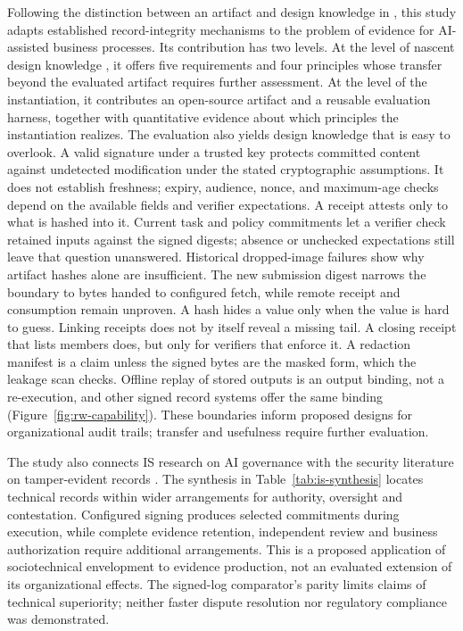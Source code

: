 \documentclass[11pt]{article}
\begin{document}
Following the distinction between an artifact and design knowledge in \citet{gregor2013}, this study adapts established record-integrity mechanisms to the problem of evidence for AI-assisted business processes. Its contribution has two levels. At the level of nascent design knowledge \citep{gregor2013}, it offers five requirements and four principles whose transfer beyond the evaluated artifact requires further assessment. At the level of the instantiation, it contributes an open-source artifact and a reusable evaluation harness, together with quantitative evidence about which principles the instantiation realizes. The evaluation also yields design knowledge that is easy to overlook. A valid signature under a trusted key protects committed content against undetected modification under the stated cryptographic assumptions. It does not establish freshness; expiry, audience, nonce, and maximum-age checks depend on the available fields and verifier expectations. A receipt attests only to what is hashed into it. Current task and policy commitments let a verifier check retained inputs against the signed digests; absence or unchecked expectations still leave that question unanswered. Historical dropped-image failures show why artifact hashes alone are insufficient. The new submission digest narrows the boundary to bytes handed to configured fetch, while remote receipt and consumption remain unproven. A hash hides a value only when the value is hard to guess. Linking receipts does not by itself reveal a missing tail. A closing receipt that lists members does, but only for verifiers that enforce it. A redaction manifest is a claim unless the signed bytes are the masked form, which the leakage scan checks. Offline replay of stored outputs is an output binding, not a re-execution, and other signed record systems offer the same binding (Figure~\ref{fig:rw-capability}). These boundaries inform proposed designs for organizational audit trails; transfer and usefulness require further evaluation.

The study also connects IS research on AI governance \citep{berente2021,mantymaki2022,papagiannidis2025} with the security literature on tamper-evident records \citep{schneier1999,crosby2009,laurie2013}. The synthesis in Table~\ref{tab:is-synthesis} locates technical records within wider arrangements for authority, oversight and contestation. Configured signing produces selected commitments during execution, while complete evidence retention, independent review and business authorization require additional arrangements. This is a proposed application of sociotechnical envelopment \citep{asatiani2021} to evidence production, not an evaluated extension of its organizational effects. The signed-log comparator's parity limits claims of technical superiority; neither faster dispute resolution nor regulatory compliance was demonstrated.
\end{document}

